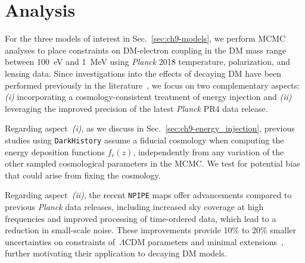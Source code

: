 \section{Analysis}
\label{sec:ch9-analysis}

For the three models of interest in Sec.~\ref{sec:ch9-models}, we perform MCMC analyses to place constraints on DM-electron coupling in the DM mass range between 100~eV and 1~MeV using \textit{Planck} 2018 temperature, polarization, and lensing data.
Since investigations into the effects of decaying DM have been performed previously in the literature~\cite{Liu:2023nct, Capozzi:2023xie, 2024arXiv240813305X}, we focus on two complementary aspects: \textit{(i)} incorporating a cosmology-consistent treatment of energy injection and \textit{(ii)} leveraging the improved precision of the latest \textit{Planck} PR4 data release.

Regarding aspect~\textit{(i)}, as we discuss in Sec.~\ref{sec:ch9-energy_injection}, previous studies using \texttt{DarkHistory} assume a fiducial cosmology when computing the energy deposition functions $f_c(z)$, independently from any variation of the other sampled cosmological parameters in the MCMC. We test for potential bias that could arise from fixing the cosmology.


Regarding aspect~\textit{(ii)}, the recent \texttt{NPIPE} maps offer advancements compared to previous \textit{Planck} data releases, including increased sky coverage at high frequencies and improved processing of time-ordered data, which lead to a reduction in small-scale noise.
These improvements provide 10\% to 20\% smaller uncertainties on constraints of~$\Lambda$CDM parameters and minimal extensions~\cite{Tristram:2023haj}, further motivating their application to decaying DM models.

